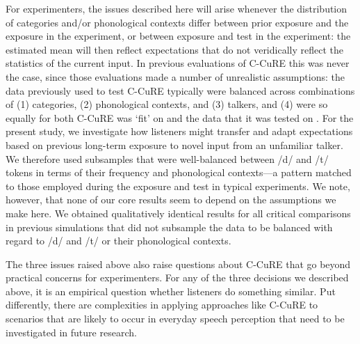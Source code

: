 \documentclass[
  11pt,
  man,floatsintext]{apa6}
\begin{document}
For experimenters, the issues described here will arise whenever the distribution of categories and/or phonological contexts differ between prior exposure and the exposure in the experiment, or between exposure and test in the experiment: the estimated mean will then reflect expectations that do not veridically reflect the statistics of the current input. In previous evaluations of C-CuRE this was never the case, since those evaluations made a number of unrealistic assumptions: the data previously used to test C-CuRE typically were balanced across combinations of (1) categories, (2) phonological contexts, and (3) talkers, and (4) were so equally for both C-CuRE was `fit' on and the data that it was tested on \autocites[see, e.g.,][]{mcmurray-jongman2011}[for a critique and demonstration that these assumptions can affect the conclusions to be drawn about the plausibility of different normalization approaches, see][]{barreda-nearey2018}. For the present study, we investigate how listeners might transfer and adapt expectations based on previous long-term exposure to novel input from an unfamiliar talker. We therefore used subsamples that were well-balanced between /d/ and /t/ tokens in terms of their frequency and phonological contexts---a pattern matched to those employed during the exposure and test in typical experiments. We note, however, that none of our core results seem to depend on the assumptions we make here. We obtained qualitatively identical results for all critical comparisons in previous simulations that did not subsample the data to be balanced with regard to /d/ and /t/ or their phonological contexts.

The three issues raised above also raise questions about C-CuRE that go beyond practical concerns for experimenters. For any of the three decisions we described above, it is an empirical question whether listeners do something similar. Put differently, there are complexities in applying approaches like C-CuRE to scenarios that are likely to occur in everyday speech perception that need to be investigated in future research.
\end{document}

